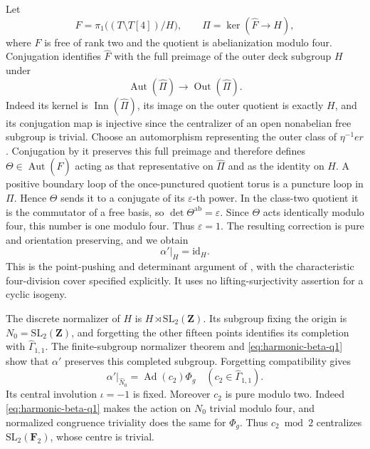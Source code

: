 Let
\[
 F=\pi_1\bigl((T\setminus T[4])/H\bigr),\qquad
 \widehat\Pi=\ker(\widehat F\longrightarrow H),
\]
where \(F\) is free of rank two and the quotient is
abelianization modulo four. Conjugation identifies
\(\widehat F\) with the full preimage of the outer deck
subgroup \(H\) under
\[
 \operatorname{Aut}(\widehat\Pi)
        \longrightarrow\operatorname{Out}(\widehat\Pi).
\]
Indeed its kernel is \(\operatorname{Inn}(\widehat\Pi)\),
its image on the outer quotient is exactly \(H\), and
its conjugation map is injective since the centralizer of
an open nonabelian free subgroup is trivial.
Choose an automorphism representing the outer class of
\(\eta^{-1}er\). Conjugation by it preserves this full
preimage and therefore defines
\(\Theta\in\operatorname{Aut}(\widehat F)\) acting as
that representative on \(\widehat\Pi\) and as the identity
on \(H\).
A positive boundary loop of the once-punctured quotient
torus is a puncture loop in \(\Pi\). Hence \(\Theta\)
sends it to a conjugate of its \(\varepsilon\)-th power.
In the class-two quotient it is the commutator of a free
basis, so \(\det\Theta^{\mathrm{ab}}=\varepsilon\).
Since \(\Theta\) acts identically modulo four, this
number is one modulo four. Thus \(\varepsilon=1\).
The resulting correction is pure and orientation preserving,
and we obtain
\begin{equation}
                  \alpha'|_H=\mathrm{id}_H.                 \label{eq:harmonic-beta-q1}
\end{equation}
This is the point-pushing and determinant argument of
\cite[Proposition~18, Step~1]{H17}, with the characteristic
four-division cover specified explicitly. It uses no
lifting-surjectivity assertion for a cyclic isogeny.

The discrete normalizer of \(H\) is
\(H\rtimes\mathrm{SL}_2(\mathbf Z)\). Its subgroup fixing
the origin is \(N_0=\mathrm{SL}_2(\mathbf Z)\), and forgetting
the other fifteen points identifies its completion with
\(\widehat\Gamma_{1,1}\). The finite-subgroup normalizer
theorem \cite[Theorem~A(iii); Theorem~6.2(iii)]{CubicBZ}
and \eqref{eq:harmonic-beta-q1} show that \(\alpha'\) preserves this completed
subgroup. Forgetting compatibility gives
\begin{equation}
     \alpha'|_{\widehat N_0}
        =\operatorname{Ad}(c_2)\Phi_g
              \quad(c_2\in\widehat\Gamma_{1,1}).             \label{eq:harmonic-beta-q2}
\end{equation}
Its central involution \(\iota=-1\) is fixed.
Moreover \(c_2\) is pure modulo two. Indeed \eqref{eq:harmonic-beta-q1} makes the
action on \(N_0\) trivial modulo four, and normalized
congruence triviality does the same for \(\Phi_g\).
Thus \(c_2\bmod2\) centralizes
\(\mathrm{SL}_2(\mathbf F_2)\), whose centre is trivial.

